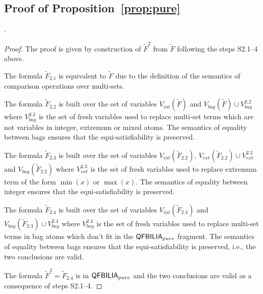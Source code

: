 \subsection{Proof of Proposition~\ref{prop:pure}}.
\label{app:proof:pure}


\begin{proof}
The proof is given by construction of $\tilde{F}^2$ from $\tilde{F}$ following the steps S2.1--4 above.

The formula $\tilde{F}_{2.1}$ is equivalent to $\tilde{F}$ due to the definition of the semantics of comparison operations over multi-sets.

The formula $\tilde{F}_{2.2}$ is built over the set of variables
$V_{int}(\tilde{F})$ and $V_{bag}(\tilde{F})\cup V^{2.2}_{bag}$
where $V^{2.2}_{bag}$ is the set of fresh variables used to replace multi-set terms which are not variables in integer, extremum or mixed atoms. The semantics of equality between bags ensures that the equi-satisfiability is preserved.

The formula $\tilde{F}_{2.3}$ is built over the set of variables
$V_{int}(\tilde{F}_{2.2})$, $V_{ext}(\tilde{F}_{2.2})\cup V^{2.3}_{ext}$ and $V_{bag}(\tilde{F}_{2.2})$
where $V^{2.3}_{ext}$ is the set of fresh variables used to replace extremum term of the form $\min(x)$ or $\max(x)$. The semantics of equality between integer ensures that the equi-satisfiability is preserved.

The formula $\tilde{F}_{2.4}$ is built over the set of variables
$V_{int}(\tilde{F}_{2.3})$ and $V_{bag}(\tilde{F}_{2.3})\cup V^{2.4}_{bag}$
where $V^{2.4}_{bag}$ is the set of fresh variables used to replace multi-set terms in bag atoms which don't fit in the $\textsf{QFBILIA}_{pure}$ fragment. The semantics of equality between bags ensures that the equi-satisfiability is preserved, i.e., the two conclusions are valid.

The formula $\tilde{F}^2 = \tilde{F}_{2.4}$ is in $\textsf{QFBILIA}_{pure}$ and the two conclusions are valid as a consequence of steps S2.1--4.

\end{proof}

